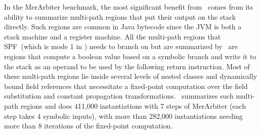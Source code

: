 In the MerArbiter benchmark, the most significant benefit from \tool\ comes from its ability to summarize multi-path
regions that put their output on the stack directly.
%
Such regions are common in Java bytecode since the JVM is both a stack machine and a register machine.
%
All the multi-path regions that SPF~(which is mode 1 in \tool) needs to branch on but are summarized by \tool\ are
regions that compute a boolean value based on a symbolic branch and write it to the stack as an operand to be used
by the following return instruction.
%
Most of these multi-path regions lie inside several levels of nested classes and dynamically bound field references
that necessitate a fixed-point computation over the field substitution and constant propagation transformations.
%
\tool\ summarizes such multi-path regions and does 411,000 instantiations with 7 steps of MerArbiter (each step takes 4
symbolic inputs), with more than 282,000 instantiations needing more than 8 iterations of the fixed-point computation.

